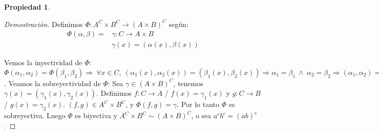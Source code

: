 \documentclass{article}
\newtheorem*{propiedad}{Propiedad}
\begin{document}
\begin{propiedad}
\end{propiedad}
\begin{proof}[Demostración] 
 Definimos $\Phi : A^C \times B^C \rightarrow (A\times B)^C$ según:
\begin{align*}
\Phi(\alpha, \beta) =& \gamma: C \rightarrow A\times B \\
& \gamma(x) = (\alpha(x), \beta(x))
\end{align*}

Vemos la inyectividad de $\Phi$: \newline $\Phi(\alpha_1, \alpha_2) = \Phi(\beta_1, \beta_2) \Rightarrow \ \forall x \in C,\  (\alpha_1(x), \alpha_2(x)) = (\beta_1(x), \beta_2(x)) \Rightarrow \alpha_1 = \beta_1 \ \land \ \alpha_2 = \beta_2 \Rightarrow (\alpha_1, \alpha_2) = (\beta_1, \beta_2)$.
\newline \newline
Veamos la sobreyectividad de $\Phi$: \newline Sea $\gamma \in (A \times B)^C$, tenemos $\gamma(x) = (\gamma_1(x), \gamma_2(x))$. Definimos $f: C \rightarrow A$ / $f(x) = \gamma_1(x)$ y $g: C \rightarrow B$ / $g(x) = \gamma_2(x)$. \newline \newline $(f,g) \in A^C \times B^C$, y $\Phi(f,g) = \gamma$. Por lo tanto $\Phi$ es sobreyectiva. 
\newline \newline Luego $\Phi$ es biyectiva y $A^C \times B^C \sim (A\times B)^C$, o sea $a^cb^c = (ab)^c$.

\end{proof}
\end{document}
